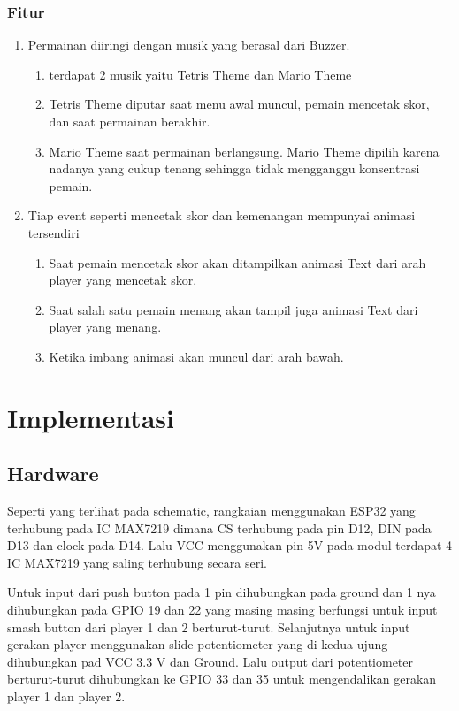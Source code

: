 \documentclass[a4paper,12pt]{article}
\begin{document}
\subsubsection{Fitur}
\begin{enumerate}
    \item Permainan diiringi dengan musik yang berasal dari Buzzer.
        \begin{enumerate}
            \item terdapat 2 musik yaitu Tetris Theme dan Mario Theme
            \item Tetris Theme diputar saat menu awal muncul, pemain mencetak skor, dan saat permainan berakhir.
            \item Mario Theme saat permainan berlangsung. Mario Theme dipilih karena nadanya yang cukup tenang
                sehingga tidak mengganggu konsentrasi pemain.
        \end{enumerate}
    \item Tiap event seperti mencetak skor dan kemenangan mempunyai animasi tersendiri
    \begin{enumerate}
        \item Saat pemain mencetak skor akan ditampilkan animasi Text dari arah player yang mencetak skor.
        \item Saat salah satu pemain menang akan tampil juga animasi Text dari player yang menang.
        \item Ketika imbang animasi akan muncul dari arah bawah.
    \end{enumerate}
\end{enumerate}
\section{Implementasi}
\subsection{Hardware}
Seperti yang terlihat pada schematic, rangkaian menggunakan ESP32 yang terhubung pada IC MAX7219 dimana CS
terhubung pada pin D12, DIN pada D13 dan clock pada D14. Lalu VCC menggunakan pin 5V
pada modul terdapat 4 IC MAX7219 yang saling terhubung secara seri.

Untuk input dari push button pada 1 pin dihubungkan pada ground dan 1 nya dihubungkan pada GPIO 19 dan 22 yang masing
masing berfungsi untuk input smash button dari player 1 dan 2 berturut-turut. Selanjutnya untuk input gerakan player menggunakan
slide potentiometer yang di kedua ujung dihubungkan pad VCC 3.3 V dan Ground. Lalu output dari potentiometer
berturut-turut dihubungkan ke GPIO 33 dan 35 untuk mengendalikan gerakan player 1 dan player 2.
\end{document}
